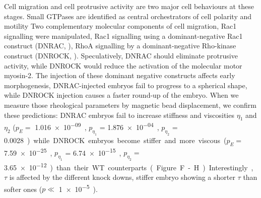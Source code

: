 Cell migration and cell protrusive activity are two major cell behaviours at these stages.
Small GTPases are identified as central orchestrators of cell polarity and motility \cite{}%
Two complementary molecular components of cell migration, Rac1 signalling were manipulated,
Rac1 signalling using a dominant-negative Rac1 construct (DNRAC, \cite{}), RhoA signalling by a dominant-negative Rho-kinase construct (DNROCK, \cite{}%
).
Speculatively, DNRAC should eliminate protrusive activity, while DNROCK would reduce the activation of the molecular motor myosin-2.
The injection of these dominant negative constructs affects early morphogenesis, DNRAC-injected embryos fail to progress to a spherical shape, while DNROCK injection causes a faster round-up of the embryo.
When we measure those rheological parameters by magnetic bead displacement, we confirm these predictions: DNRAC embryos fail to increase stiffness and viscosities $\eta_1$ and $\eta_2$ ($p_E = $ \SI{1.016e-09}, $p_{\eta_1}$ = \SI{1.876e-04}, $p_{\eta_2}$ = \SI{0.0028}) while DNROCK embryos become stiffer and more viscous ($p_E =$ \SI{7.59e-25}, $p_{\eta_1}$ = \SI{6.74e-15}, $p_{\eta_2} =$ \SI{3.65e-12}) than their WT counterparts (Figure .F-H).
Interestingly, $\tau$ is affected by the different knock downs, stiffer embryo showing a shorter $\tau$ than softer ones ($p \ll $ \SI{1e-5}).

